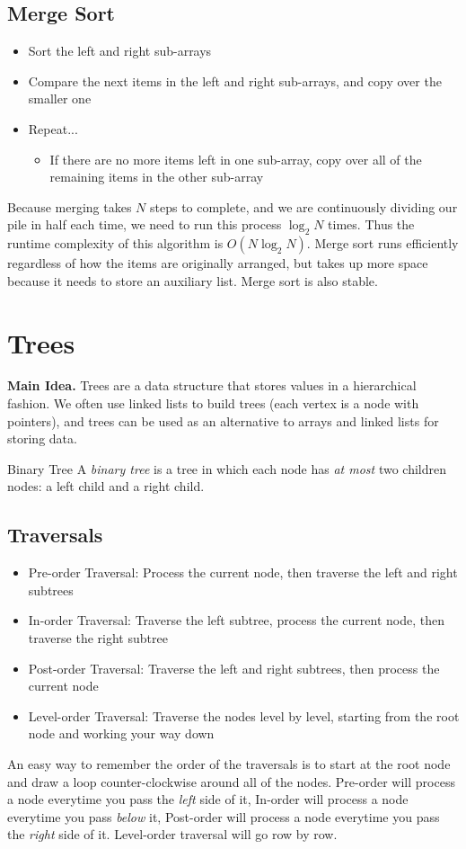 \documentclass[class=article, crop=false]{standalone}
\begin{document}
  \subsection{Merge Sort}
  \begin{itemize}
    \item Sort the left and right sub-arrays
    \item Compare the next items in the left and right sub-arrays, and copy over the smaller one
    \item Repeat...
    \begin{itemize}
      \item If there are no more items left in one sub-array, copy over all of the remaining items in the other sub-array
    \end{itemize}
  \end{itemize}
  Because merging takes $N$ steps to complete, and we are continuously dividing our pile in half each time, we need to run this process $\log_2N$ times. Thus the runtime complexity of this algorithm is $O(N\log_2N)$. Merge sort runs efficiently regardless of how the items are originally arranged, but takes up more space because it needs to store an auxiliary list. Merge sort is also stable.
  \section{Trees}
  \textbf{Main Idea.} Trees are a data structure that stores values in a hierarchical fashion. We often use linked lists to build trees (each vertex is a node with pointers), and trees can be used as an alternative to arrays and linked lists for storing data.
  \begin{definition}{Binary Tree}
    A \emph{binary tree} is a tree in which each node has \emph{at most} two children nodes: a left child and a right child.
  \end{definition}
  \subsection{Traversals}
  \begin{itemize}
    \item Pre-order Traversal: Process the current node, then traverse the left and right subtrees
    \item In-order Traversal: Traverse the left subtree, process the current node, then traverse the right subtree
    \item Post-order Traversal: Traverse the left and right subtrees, then process the current node
    \item Level-order Traversal: Traverse the nodes level by level, starting from the root node and working your way down
  \end{itemize}
  An easy way to remember the order of the traversals is to start at the root node and draw a loop counter-clockwise around all of the nodes. Pre-order will process a node everytime you pass the \emph{left} side of it, In-order will process a node everytime you pass \emph{below} it, Post-order will process a node everytime you pass the \emph{right} side of it. Level-order traversal will go row by row.
\end{document}
